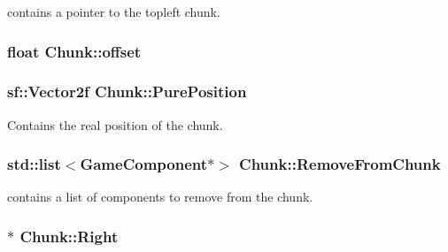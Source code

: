 contains a pointer to the topleft chunk. 

\hypertarget{class_chunk_a6ab7f8f3970c886a62ccc1630bc60a16}{
\subsubsection[{offset}]{\setlength{\rightskip}{0pt plus 5cm}float Chunk\-::offset\hspace{0.3cm}{\ttfamily [private]}}}\label{class_chunk_a6ab7f8f3970c886a62ccc1630bc60a16}
\hypertarget{class_chunk_ace1577872b1189bc7fd88a9b3817ce98}{
\subsubsection[{Pure\-Position}]{\setlength{\rightskip}{0pt plus 5cm}sf\-::\-Vector2f Chunk\-::\-Pure\-Position\hspace{0.3cm}{\ttfamily [private]}}}\label{class_chunk_ace1577872b1189bc7fd88a9b3817ce98}


Contains the real position of the chunk. 

\hypertarget{class_chunk_adf6692fdab4518524e217cc0ef09d282}{
\subsubsection[{Remove\-From\-Chunk}]{\setlength{\rightskip}{0pt plus 5cm}std\-::list$<${\bf Game\-Component}$\ast$$>$ Chunk\-::\-Remove\-From\-Chunk\hspace{0.3cm}{\ttfamily [private]}}}\label{class_chunk_adf6692fdab4518524e217cc0ef09d282}


contains a list of components to remove from the chunk. 

\hypertarget{class_chunk_a0bcf134e2aba0ca49370272c2b3f17a4}{
\subsubsection[{Right}]{$\ast$ Chunk\-::\-Right\hspace{0.3cm}{\ttfamily [private]}}}\label{class_chunk_a0bcf134e2aba0ca49370272c2b3f17a4}


